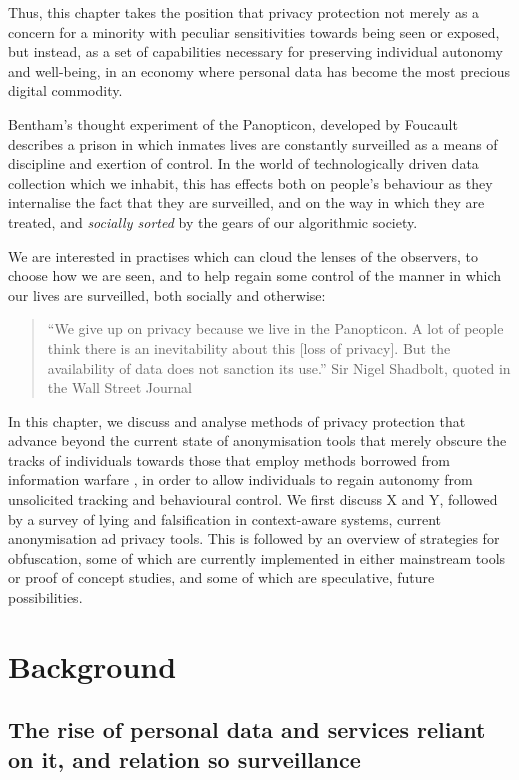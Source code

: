 \documentclass{IOS-Book-Article}     %
\begin{document}
Thus, this chapter takes the position that privacy protection not merely as a
concern for a minority with peculiar sensitivities towards being seen or
exposed, but instead, as a set of capabilities necessary for preserving
individual autonomy and well-being, in an economy where personal data has become
the most precious digital commodity. 

Bentham's thought experiment of the Panopticon, developed by Foucault describes
a prison in which inmates lives are constantly surveilled as a means of
discipline and exertion of control.
In the world of technologically driven data collection which we inhabit,
this has effects both
on people's behaviour as they internalise the fact that they are surveilled, and
on the way in which they are treated, and \emph{socially sorted} by the gears of
our algorithmic society\cite{simon2005Panopticism}.

We are interested in practises which can cloud the lenses of the observers, to
choose how we are seen, and to help regain some control of
the manner in which our lives are surveilled, both socially and otherwise:
\begin{quote}``We give up on privacy because we live in the Panopticon. A lot of
people think there is an inevitability about this [loss of privacy]. But the
availability of data does not sanction its use.'' Sir Nigel Shadbolt,
quoted in the Wall Street Journal\cite{rooney2012OpenData}\end{quote}

In this chapter, we discuss and analyse methods of privacy protection that
advance beyond the current state of anonymisation tools that merely obscure the tracks
of individuals towards those that employ methods borrowed from
information warfare \cite{}, in order to allow individuals to regain autonomy
from unsolicited tracking and behavioural control.  We first discuss X and Y, followed by a
survey of lying and falsification in context-aware systems, current
anonymisation ad privacy tools. This is followed by an overview of
strategies for obfuscation, some of which are currently implemented in either
mainstream tools or proof of concept studies,  and some of which are
speculative, future possibilities.

\section{Background}

\subsection{The rise of personal data and services reliant on it, and relation
so surveillance}
\end{document}
